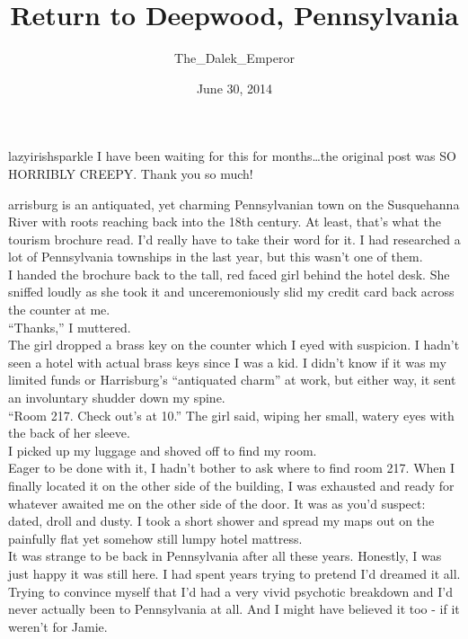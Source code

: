 \documentclass[a5paper]{scrartcl}
\title{Return to Deepwood, Pennsylvania}
\author{The\_Dalek\_Emperor}
\date{June 30, 2014}
\begin{document}
\maketitle

\begin{shadequote}[l]{lazyirishsparkle}
I have been waiting for this for months\dots the original post was SO HORRIBLY CREEPY. Thank you so much!
\end{shadequote}
\clearpage

arrisburg is an antiquated, yet charming Pennsylvanian town on the Susquehanna River with roots reaching back into the 18th century. At least, that's what the tourism brochure read. I'd really have to take their word for it.  I had researched a lot of Pennsylvania townships in the last year, but this wasn't one of them.\\


I handed the brochure back to the tall, red faced girl behind the hotel desk. She sniffed loudly as she took it and unceremoniously slid my credit card back across the counter at me.\\


\enquote{Thanks,} I muttered.\\


The girl dropped a brass key on the counter which I eyed with suspicion. I hadn't seen a hotel with actual brass keys since I was a kid. I didn't know if it was my limited funds or Harrisburg's \enquote{antiquated charm} at work, but either way, it sent an involuntary shudder down my spine.\\


\enquote{Room 217. Check out's at 10.} The girl said, wiping her small, watery eyes with the back of her sleeve.\\


I picked up my luggage and shoved off to find my room. \\


Eager to be done with it, I hadn't bother to ask where to find room 217. When I finally located it on the other side of the building, I was exhausted and ready for whatever awaited me on the other side of the door. It was as you'd suspect: dated, droll and dusty. I took a short shower and spread my maps out on the painfully flat yet somehow still lumpy hotel mattress.\\


It was strange to be back in Pennsylvania after all these years. Honestly, I was just happy it was still here. I had spent years trying to pretend I'd dreamed it all. Trying to convince myself that I'd had a very vivid psychotic breakdown and I'd never actually been to Pennsylvania at all. And I might have believed it too - if it weren't for Jamie.\\
\end{document}
